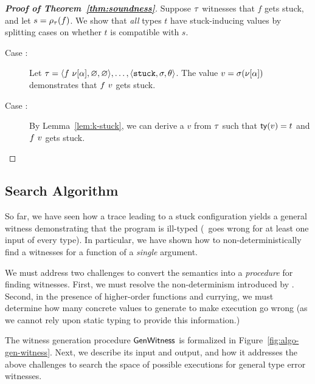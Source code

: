\begin{proof}[\textbf{Proof of Theorem~\ref{thm:soundness}}]
%
Suppose $\tau$ witnesses that $f$ gets stuck,
and let $s = \rho_{\tau}(f)$.
We show that \emph{all} types $t$ have stuck-inducing
values by splitting cases on whether $t$ is
compatible with $s$. %
%
\begin{description}
\item [Case :]
  Let $\tau = \langle f\ \nu[\alpha], \varnothing, \varnothing \rangle,\ldots,\langle \mathtt{stuck}, \sigma, \theta \rangle$.
  The value $v = \sigma(\nu[\alpha])$ demonstrates that
  $f\ v$ gets stuck.
\item [Case :] By Lemma~\ref{lem:k-stuck}, we can derive
  a $v$ from $\tau$ such that $\mathsf{ty}(v) = {t}$ and $f\ v$ gets
  stuck.
\end{description}
\end{proof}

\subsection{Search Algorithm}
\label{sec:search-algorithm}
%
So far, we have seen how a trace leading to a stuck configuration yields
a general witness demonstrating that the program is ill-typed (\ie\ goes
wrong for at least one input of every type).
In particular, we have shown how to non-deterministically find a witnesses
for a function of a \emph{single} argument.

We must address two challenges
to convert the semantics into a \emph{procedure} for finding
witnesses.
%
First, we must resolve the non-determinism introduced by \gensym.
%
Second, in the presence of higher-order functions and currying,
we must determine how many concrete values to generate to make
execution go wrong (as we cannot rely upon static typing to
provide this information.)

The witness generation procedure $\mathsf{GenWitness}$ is formalized in
Figure~\ref{fig:algo-gen-witness}.
%
Next, we describe its input and output, and how it
addresses the above challenges to search the space of possible
executions for general type error witnesses.

